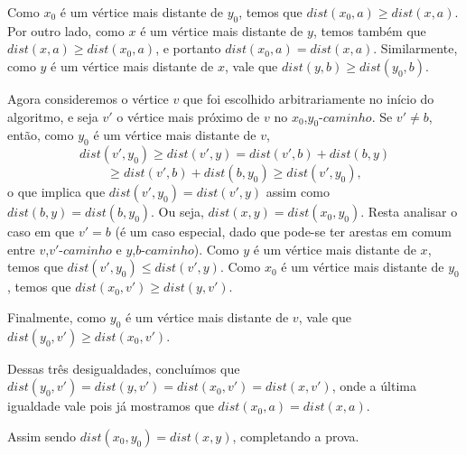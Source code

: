 \documentclass[a4paper,12pt]{article}
\begin{document}
\begin{itemize}
		\begin{center}  \end{center}


		Como $x_0$ é um vértice mais distante de $y_0$,
		temos que $dist(x_0,a) \ge dist(x,a)$.
		Por outro lado, como $x$ é um vértice mais distante
		de $y$, temos também que $dist(x,a)\ge dist(x_0,a)$,
		e portanto $dist(x_0,a) = dist(x,a)$.
		Similarmente, como $y$ é um vértice mais distante de
		$x$, vale que $dist(y,b) \ge dist(y_0,b)$.

		Agora consideremos o vértice $v$ que foi escolhido 
		arbitrariamente no início do algoritmo, e seja $v'$
		o vértice mais próximo de $v$ no $x_0$,$y_0$-$caminho$.
		Se $v'\ne b$, então, como $y_0$ é um vértice mais 
		distante de $v$,
		$$ dist(v',y_0) \ge dist(v',y) = dist(v',b) + dist(b,y) $$
		$$ \ge dist(v',b) + dist(b,y_0) \ge dist(v',y_0), $$
		o que implica que $dist(v',y_0) = dist(v',y)$ assim
		como $ dist(b,y) = dist(b,y_0) $. 
		Ou seja, $dist(x,y) = dist(x_0,y_0)$.
		Resta analisar o caso em que $v'=b$ (é um caso especial,
		dado que pode-se ter arestas em comum entre $v$,$v'$-$caminho$ 
		e $y$,$b$-$caminho$).
		Como $y$ é um vértice mais distante de $x$, temos que 
		$dist(v',y_0) \le dist(v',y)$.
		Como $x_0$ é um vértice mais distante de $y_0$, temos
		que $dist(x_0,v') \ge dist(y,v')$.
		
		Finalmente, como $y_0$ é um vértice mais distante de 
		$v$, vale que $dist(y_0,v')\ge dist(x_0,v')$.

		Dessas três desigualdades, concluímos que 
		$dist(y_0,v') = dist(y,v') = dist(x_0,v') = dist(x,v') $,
		onde a última igualdade vale pois já mostramos que
		$ dist(x_0,a) = dist(x,a) $.

		Assim sendo $dist(x_0,y_0) = dist(x,y) $, completando a prova.

	\end{itemize}
\end{document}

